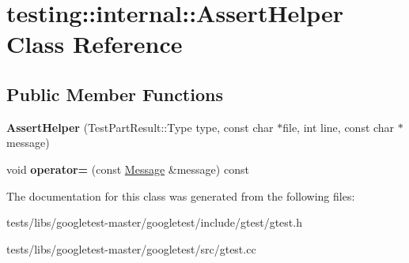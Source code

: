 \hypertarget{classtesting_1_1internal_1_1AssertHelper}{}\section{testing\+:\+:internal\+:\+:Assert\+Helper Class Reference}
\label{classtesting_1_1internal_1_1AssertHelper}
\subsection*{Public Member Functions}
\begin{DoxyCompactItemize}
\item 
\mbox{\label{classtesting_1_1internal_1_1AssertHelper_ac2c9334518fd4087189b4505567a3c90}} 
{\bfseries Assert\+Helper} (Test\+Part\+Result\+::\+Type type, const char $\ast$file, int line, const char $\ast$message)
\item 
\mbox{\label{classtesting_1_1internal_1_1AssertHelper_a97bf22d786131ab7baa86b97a27aeb4d}} 
void {\bfseries operator=} (const \hyperlink{classtesting_1_1Message}{Message} \&message) const
\end{DoxyCompactItemize}


The documentation for this class was generated from the following files\+:\begin{DoxyCompactItemize}
\item 
tests/libs/googletest-\/master/googletest/include/gtest/gtest.\+h\item 
tests/libs/googletest-\/master/googletest/src/gtest.\+cc\end{DoxyCompactItemize}
